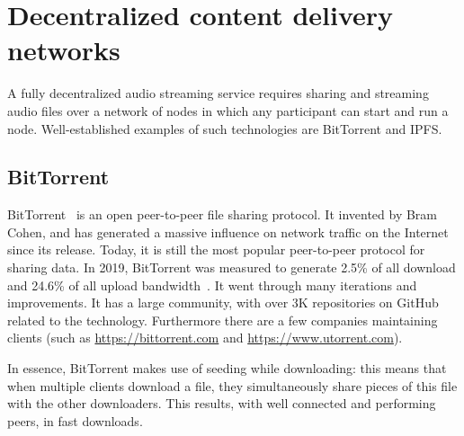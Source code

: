 \section{Decentralized content delivery networks}
\label{sec:decentralized-content-delivery}
A fully decentralized audio streaming service requires sharing and streaming audio files over a network of nodes in which any participant can start and run a node. Well-established examples of such technologies are BitTorrent and IPFS.

\subsection{BitTorrent}
BitTorrent~\citep{cohen2002bittorrent} is an open peer-to-peer file sharing protocol. It invented by Bram Cohen, and has generated a massive influence on network traffic on the Internet since its release. Today, it is still the most popular peer-to-peer protocol for sharing data. In 2019, BitTorrent was measured to generate 2.5\% of all download and 24.6\% of all upload bandwidth~\citep{marozzo2020}. It went through many iterations and improvements. It has a large community, with over 3K repositories on GitHub related to the technology. Furthermore there are a few companies maintaining clients (such as \url{https://bittorrent.com} and \url{https://www.utorrent.com}).

In essence, BitTorrent makes use of seeding while downloading: this means that when multiple clients download a file, they simultaneously share pieces of this file with the other downloaders. This results, with well connected and performing peers, in fast downloads. 



